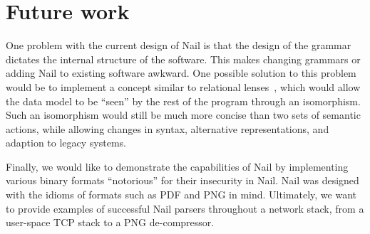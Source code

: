 \section{Future work}
\label{s:future}


One problem with the current design of Nail is that the design of the
grammar dictates the internal structure of the software.  This makes
changing grammars or adding Nail to existing software awkward.
One possible solution to this problem would be to implement a concept
similar to relational lenses~\cite{bohannon2006relational}, which would
allow the data model to be ``seen'' by the rest of the program through
an isomorphism.  Such an isomorphism would still be much more concise
than two sets of semantic actions, while allowing changes in syntax,
alternative representations, and adaption to legacy systems.

Finally, we would like to demonstrate the capabilities of Nail by
implementing various binary formats ``notorious'' for their insecurity
in Nail. Nail was designed with the idioms of formats such as PDF and
PNG in mind. Ultimately, we want to provide examples of successful Nail
parsers throughout a network stack, from a user-space TCP stack to a
PNG de-compressor.

